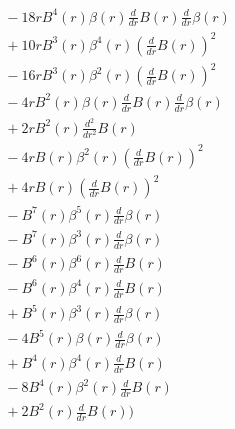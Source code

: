 \documentclass[11pt,a4paper]{article}
\begin{document}
\begin{align*}
  &\quad - 18 r B^{4}{\left(r \right)} \beta{\left(r \right)} \frac{d}{d r} B{\left(r \right)} \frac{d}{d r} \beta{\left(r \right)} \\
  &\quad + 10 r B^{3}{\left(r \right)} \beta^{4}{\left(r \right)} \left(\frac{d}{d r} B{\left(r \right)}\right)^{2} \\
  &\quad - 16 r B^{3}{\left(r \right)} \beta^{2}{\left(r \right)} \left(\frac{d}{d r} B{\left(r \right)}\right)^{2} \\
  &\quad - 4 r B^{2}{\left(r \right)} \beta{\left(r \right)} \frac{d}{d r} B{\left(r \right)} \frac{d}{d r} \beta{\left(r \right)} \\
  &\quad + 2 r B^{2}{\left(r \right)} \frac{d^{2}}{d r^{2}} B{\left(r \right)} \\
  &\quad - 4 r B{\left(r \right)} \beta^{2}{\left(r \right)} \left(\frac{d}{d r} B{\left(r \right)}\right)^{2} \\
  &\quad + 4 r B{\left(r \right)} \left(\frac{d}{d r} B{\left(r \right)}\right)^{2} \\
  &\quad - B^{7}{\left(r \right)} \beta^{5}{\left(r \right)} \frac{d}{d r} \beta{\left(r \right)} \\
  &\quad - B^{7}{\left(r \right)} \beta^{3}{\left(r \right)} \frac{d}{d r} \beta{\left(r \right)} \\
  &\quad - B^{6}{\left(r \right)} \beta^{6}{\left(r \right)} \frac{d}{d r} B{\left(r \right)} \\
  &\quad - B^{6}{\left(r \right)} \beta^{4}{\left(r \right)} \frac{d}{d r} B{\left(r \right)} \\
  &\quad + B^{5}{\left(r \right)} \beta^{3}{\left(r \right)} \frac{d}{d r} \beta{\left(r \right)} \\
  &\quad - 4 B^{5}{\left(r \right)} \beta{\left(r \right)} \frac{d}{d r} \beta{\left(r \right)} \\
  &\quad + B^{4}{\left(r \right)} \beta^{4}{\left(r \right)} \frac{d}{d r} B{\left(r \right)} \\
  &\quad - 8 B^{4}{\left(r \right)} \beta^{2}{\left(r \right)} \frac{d}{d r} B{\left(r \right)} \\
  &\quad + 2 B^{2}{\left(r \right)} \frac{d}{d r} B{\left(r \right)}\Bigr)
\end{align*}
\end{document}
